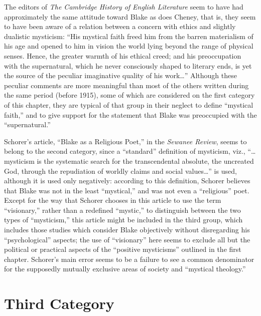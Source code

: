 \label{self:08}

The editors of \emph{The Cambridge History of English Literature}\supercite{cambridge:english-literature}
seem to have had approximately the same attitude toward
Blake as does Cheney, that is, they seem to have been aware of a relation between a concern with ethics and
slightly dualistic mysticism: \enquote{His mystical faith freed him from the barren materialism of his age and opened to him in
vision the world lying beyond the range of physical senses. Hence, the greater warmth of his ethical creed; and his
preoccupation with the supernatural, which he never consciously shaped to literary ends, is yet the source of the peculiar
imaginative quality of his work\dots} Although these peculiar comments are more meaningful than most of the others written
during the same period (before 1915), some of which are considered on the first category of this chapter, they are
typical of that group in their neglect to define \enquote{mystical faith,} and to give support for the statement that Blake was
preoccupied with the \enquote{supernatural.}

Schorer's article, \enquote{Blake as a Religious Poet,} in the \emph{Sewanee Review},\supercite{schorer:blake-poet}
seems to belong to the second category, since a \enquote{standard} definition of mysticism, viz., \enquote{\dots mysticism is the systematic search for
the transcendental absolute, the uncreated God, through the repudiation of worldly claims and
social values\dots}\supercite{schorer:blake-poet}
is used, although it is used only negatively: according to this definition, Schorer
believes that Blake was not in the least \enquote{mystical,} and was not even a \enquote{religious} poet. Except for the way that Schorer chooses
in this article to use the term \enquote{visionary,} rather than a redefined \enquote{mystic,} to distinguish between the two types of
\enquote{mysticism,} this article might be included in the third group, which includes those studies which consider Blake objectively
without disregarding his \enquote{psychological} aspects; the use of \enquote{visionary} here seems to exclude all but the political or
practical aspects of the \enquote{positive mysticisms} outlined in the first chapter. Schorer's main error seems to be a failure
to see a common denominator for the supposedly mutually exclusive areas of society and \enquote{mystical theology.}

\section{Third Category}

